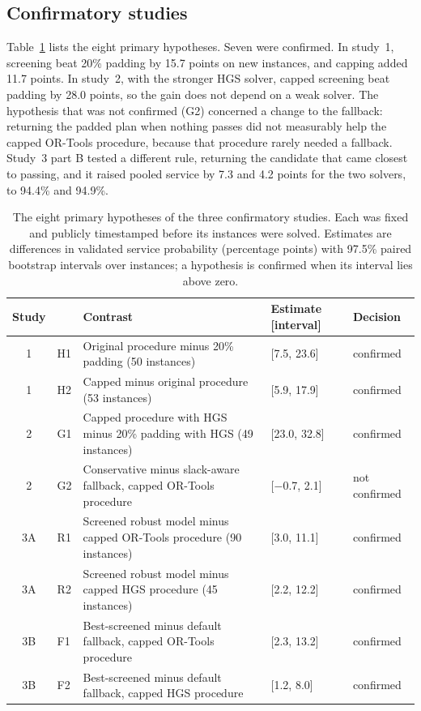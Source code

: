 \documentclass[12pt,letterpaper]{article}
\newcommand{\ConfInstances}{53}
\newcommand{\ConfCommon}{50}
\newcommand{\ConfHOneMean}{15.7}
\newcommand{\ConfHOneLo}{7.5}
\newcommand{\ConfHOneHi}{23.6}
\newcommand{\ConfHTwoMean}{11.7}
\newcommand{\ConfHTwoLo}{5.9}
\newcommand{\ConfHTwoHi}{17.9}
\newcommand{\CtwoGOneMean}{28.0}
\newcommand{\CtwoGOneLo}{23.0}
\newcommand{\CtwoGOneHi}{32.8}
\newcommand{\CtwoGTwoMean}{0.4}
\newcommand{\CtwoGTwoLo}{$-$0.7}
\newcommand{\CtwoGTwoHi}{2.1}
\newcommand{\CtwoCommon}{49}
\newcommand{\PbFOne}{7.3}
\newcommand{\PbFOneLo}{2.3}
\newcommand{\PbFOneHi}{13.2}
\newcommand{\PbFTwo}{4.2}
\newcommand{\PbFTwoLo}{1.2}
\newcommand{\PbFTwoHi}{8.0}
\newcommand{\PbFThree}{94.4}
\newcommand{\PbFFour}{94.9}
\newcommand{\PaROne}{6.7}
\newcommand{\PaROneLo}{3.0}
\newcommand{\PaROneHi}{11.1}
\newcommand{\PaRTwo}{6.7}
\newcommand{\PaRTwoLo}{2.2}
\newcommand{\PaRTwoHi}{12.2}
\newcommand{\PaInstances}{90}
\begin{document}
\subsection{Confirmatory studies}

Table~\ref{tab:primaries} lists the eight primary hypotheses. Seven were confirmed.
In study~1, screening beat 20\% padding by \ConfHOneMean{} points on new instances,
and capping added \ConfHTwoMean{} points. In study~2, with the stronger HGS solver,
capped screening beat padding by \CtwoGOneMean{} points, so the gain does not depend
on a weak solver. The hypothesis that was not confirmed (G2) concerned a change to
the fallback: returning the padded plan when nothing passes did not measurably help
the capped OR-Tools procedure, because that procedure rarely needed a fallback.
Study~3 part B tested a different rule, returning the candidate that came closest to
passing, and it raised pooled service by \PbFOne{} and \PbFTwo{} points for the two
solvers, to \PbFThree\% and \PbFFour\%.

\begin{table}[t]
\centering
\small
\caption{The eight primary hypotheses of the three confirmatory studies. Each was fixed and publicly timestamped before its instances were solved. Estimates are differences in validated service probability (percentage points) with 97.5\% paired bootstrap intervals over instances; a hypothesis is confirmed when its interval lies above zero.}
\label{tab:primaries}
\begin{tabular}{@{}cl>{\raggedright\arraybackslash}p{7.2cm}>{\raggedright\arraybackslash}p{2.9cm}l@{}}
\toprule
Study & & Contrast & Estimate [interval] & Decision\\
\midrule
1 & H1 & Original procedure minus 20\% padding (\ConfCommon{} instances) & \ConfHOneMean{} [\ConfHOneLo, \ConfHOneHi] & confirmed\\
1 & H2 & Capped minus original procedure (\ConfInstances{} instances) & \ConfHTwoMean{} [\ConfHTwoLo, \ConfHTwoHi] & confirmed\\
2 & G1 & Capped procedure with HGS minus 20\% padding with HGS (\CtwoCommon{} instances) & \CtwoGOneMean{} [\CtwoGOneLo, \CtwoGOneHi] & confirmed\\
2 & G2 & Conservative minus slack-aware fallback, capped OR-Tools procedure & \CtwoGTwoMean{} [\CtwoGTwoLo, \CtwoGTwoHi] & not confirmed\\
3A & R1 & Screened robust model minus capped OR-Tools procedure (\PaInstances{} instances) & \PaROne{} [\PaROneLo, \PaROneHi] & confirmed\\
3A & R2 & Screened robust model minus capped HGS procedure (45 instances) & \PaRTwo{} [\PaRTwoLo, \PaRTwoHi] & confirmed\\
3B & F1 & Best-screened minus default fallback, capped OR-Tools procedure & \PbFOne{} [\PbFOneLo, \PbFOneHi] & confirmed\\
3B & F2 & Best-screened minus default fallback, capped HGS procedure & \PbFTwo{} [\PbFTwoLo, \PbFTwoHi] & confirmed\\
\bottomrule
\end{tabular}
\end{table}
\end{document}
